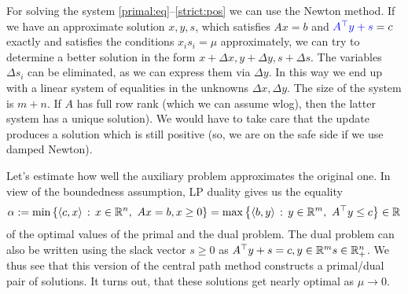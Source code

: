 	For solving the system \eqref{primal:eq}--\eqref{strict:pos} we can use the Newton method.
If we have an approximate solution $x, y, s$, which satisfies $A x = b$ and $\textcolor{blue}{A^\top y + s}  =c$ exactly and satisfies the conditions $x_i s_i = \mu$ approximately, we can try to determine a better solution in the form $x + \Delta x, y + \Delta y, s + \Delta s$.
%
The variables $\Delta s_i$ can be eliminated, as we can express them via $\Delta y$. In this way we end up with a linear system of equalities in the unknowns $\Delta x, \Delta y$. The size of the system is $m+n$. If $A$ has full row rank (which we can assume wlog), then the latter system has a unique solution). We would have to take care that the update produces a solution which is still positive (so, we are on the safe side if we use damped Newton). 

	Let's estimate how well the auxiliary problem approximates the original one. In view of the boundedness assumption, LP duality gives us the equality
	\[
		\alpha := \min \left\{  \left\langle c , x \right\rangle  \,:\, x \in \mathbb{R}^n, \ A x = b, x \ge 0 \right\} = \max \left\{  \left\langle b , y \right\rangle \,:\,  y \in \mathbb{R}^m, \ A^\top y \le c \right\} \in \mathbb{R}
	\]
	of the optimal values of the primal and the dual problem. 
	The dual problem can also be written using the slack vector $s \ge 0$ as $A^\top y + s = c, y \in \mathbb{R}^m s \in \mathbb{R}_+^n$. We thus see that this version of the central path method constructs a primal/dual pair of solutions. It turns out, that these solutions get nearly optimal as $\mu \to 0$. 
	
